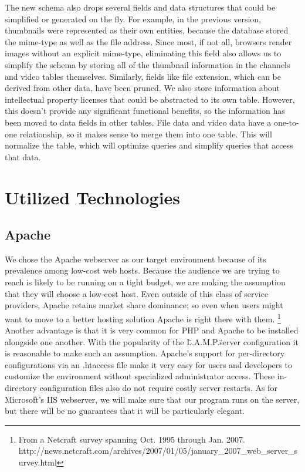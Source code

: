 \documentclass[a4paper,12pt]{report}
\begin{document}
The new schema also drops several fields and data structures that could be simplified or generated on the fly.
For example, in the previous version, thumbnails were represented as their own entities, because the database stored the mime-type as well as the file address.
Since most, if not all, browsers render images without an explicit mime-type, eliminating this field also allows us to simplify the schema by storing all of the thumbnail information in the channels and video tables themselves.
Similarly, fields like file extension, which can be derived from other data, have been pruned.
We also store information about intellectual property licenses that could be abstracted to its own table.
However, this doesn't provide any significant functional benefits, so the information has been moved to data fields in other tables. 
File data and video data have a one-to-one relationship, so it makes sense to merge them into one table.
This will normalize the table, which will optimize queries and simplify queries that access that data.


\chapter{Utilized Technologies}
\section{Apache}
We chose the Apache webserver as our target environment because of its prevalence among low-cost web hosts.
Because the audience we are trying to reach is likely to be running on a tight budget, we are making the assumption that they will choose a low-cost host.
Even outside of this class of service providers, Apache retains market share dominance; so even when users might want to move to a better hosting solution Apache is right there with them. \footnote{From a Netcraft survey spanning Oct. 1995 through Jan. 2007. http://news.netcraft.com/archives/2007/01/05/january\_2007\_web\_server\_survey.html}
Another advantage is that it is very common for PHP and Apache to be installed alongside one another.
With the popularity of the \"L.A.M.P.\" server configuration it is reasonable to make such an assumption.
Apache's support for per-directory configurations via an .htaccess file make it very easy for users and developers to customize the environment without specialized administrator access.
These in-directory configuration files also do not require costly server restarts.
As for Microsoft's IIS webserver, we will make sure that our program runs on the server, but there will be no guarantees that it will be particularly elegant.
\end{document}
